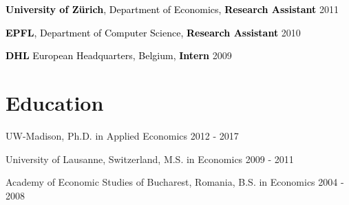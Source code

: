 \documentclass[margin,line]{res}                          %
\newenvironment{list1}{
  \begin{list}{\ding{113}}{%
      \setlength{\itemsep}{0in}
      \setlength{\parsep}{0in} \setlength{\parskip}{0in}
      \setlength{\topsep}{0in} \setlength{\partopsep}{0in} 
      \setlength{\leftmargin}{0.17in}}}{\end{list}}
\newenvironment{list2}{
  \begin{list}{$\bullet$}{%
      \setlength{\itemsep}{0in}
      \setlength{\parsep}{0in} \setlength{\parskip}{0in}
      \setlength{\topsep}{0in} \setlength{\partopsep}{0in} 
      \setlength{\leftmargin}{0.2in}}}{\end{list}}
\begin{document}
\begin{resume}
\begin{list1}
\item[] \textcolor{Black}{\textbf{University of Z\"urich},  Department of Economics, \textbf{Research Assistant}} \hspace{3.0cm} 2011
\item[]

\item[] \textcolor{Black}{\textbf{EPFL}, Department of Computer Science, \textbf{Research Assistant}} \hspace{4.35cm} 2010
\item[]


\item[] \textcolor{Black}{\textbf{DHL} European Headquarters, Belgium, \textbf{Intern}} \hspace{6.75 cm} 2009
\item[]

\end{list1}

\section{\sc Education}
\begin{list1}
\item[]  UW-Madison, Ph.D. in  Applied Economics  \hspace{6.3 cm} 2012 - 2017
\item[]  University of Lausanne, Switzerland, M.S. in Economics \hspace{4.5cm} 2009 - 2011
\item[]  Academy of Economic Studies of Bucharest, Romania, B.S. in Economics \hspace{1.85cm} 2004 - 2008
\end{list1}




\end{resume}
\end{document}
